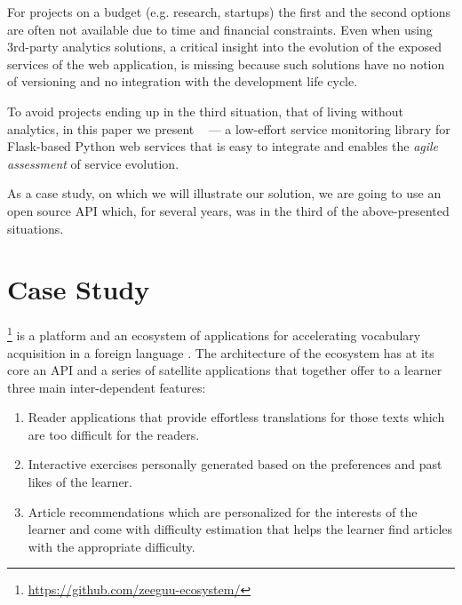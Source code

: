 \documentclass{sig-alternate-05-2015}
\begin{document}
For projects on a budget (e.g. research, startups) the first and the second options are often not available due to time and financial constraints. Even when using 3rd-party analytics solutions, a critical insight into the evolution of the exposed services of the web application, is missing because such solutions have no notion of versioning and no integration with the development life cycle.~\cite{papazoglou2011managing}

To avoid projects ending up in the third situation, that of living without analytics, in this paper we present \tool~ --- a low-effort service monitoring library for Flask-based Python web services that is easy to integrate and enables the {\em agile assessment} of service evolution. \cite{Nier12b}

As a case study, on which we will illustrate our solution, we are going to use an open source API which, for several years, was in the third of the above-presented situations.



\section{Case Study}
\label{sec:case}


  \zee\footnote{\url{https://github.com/zeeguu-ecosystem/}} is a platform and an ecosystem of applications for accelerating vocabulary acquisition in a foreign language \cite{Lungu16}. 
%
  The architecture of the ecosystem has at its core an API and a series of satellite applications that together offer to a learner three main inter-dependent features:

  \begin{enumerate}

    \item Reader applications that provide effortless translations for those texts which are too difficult for the readers.

    \item Interactive exercises personally generated based on the preferences and past likes of the learner.

    \item Article recommendations which are personalized for the interests of the learner and come with difficulty estimation that helps the learner find articles with the appropriate difficulty.

  \end{enumerate}
\end{document}
